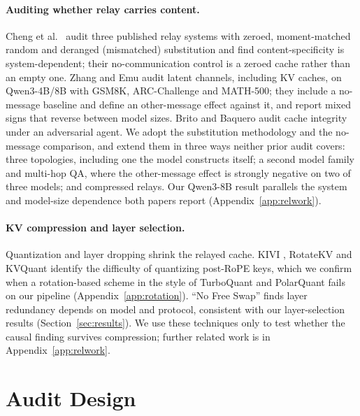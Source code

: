 \documentclass[11pt]{article}
\begin{document}
\paragraph{Auditing whether relay carries content.} Cheng et al.\
\citep{latentcommpay2026} audit three published relay systems with
zeroed, moment-matched random and deranged (mismatched) substitution and
find content-specificity is system-dependent; their no-communication
control is a zeroed cache rather than an empty one. Zhang and Emu
\citep{zhangemu2026} audit latent channels, including KV caches, on
Qwen3-4B/8B with GSM8K, ARC-Challenge and MATH-500; they include a
no-message baseline and define an other-message effect against it, and
report mixed signs that reverse between model sizes. Brito and Baquero
\citep{latentagentslie2026} audit cache integrity under an adversarial
agent. We adopt the substitution methodology and the no-message
comparison, and extend them in three ways neither prior audit covers:
three topologies, including one the model constructs itself; a second
model family and multi-hop QA, where the other-message effect is strongly
negative on two of three models; and compressed relays. Our Qwen3-8B
result parallels the system and model-size dependence both papers report
(Appendix~\ref{app:relwork}).

\paragraph{KV compression and layer selection.} Quantization and layer
dropping shrink the relayed cache. KIVI \citep{kivi2024}, RotateKV
\citep{rotatekv2025} and KVQuant \citep{kvquant2024} identify the
difficulty of quantizing post-RoPE keys, which we confirm when a
rotation-based scheme in the style of TurboQuant \citep{turboquant2026}
and PolarQuant \citep{polarquant2026} fails on our pipeline
(Appendix~\ref{app:rotation}). ``No Free Swap'' \citep{nofreeswap2026}
finds layer redundancy depends on model and protocol, consistent with
our layer-selection results (Section~\ref{sec:results}). We use these
techniques only to test whether the causal finding survives compression;
further related work is in Appendix~\ref{app:relwork}.

\section{Audit Design}
\label{sec:method}
\end{document}
